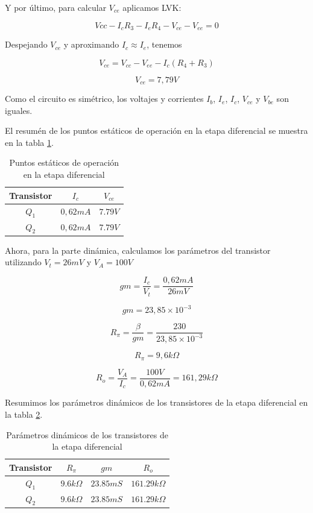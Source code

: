 Y por último, para calcular $V_{ce}$ aplicamos LVK:

$$Vcc - I_cR_3 - I_eR_4 - V_{ce} - V_{ee} = 0$$

Despejando $V_{ce}$ y aproximando $I_c \approx I_e$, tenemos 

$$V_{ce} = V_{cc}  - V_{ee} - I_c (R_4 + R_3)$$

$$V_{ce} = 7,79 V$$

Como el circuito es simétrico, los voltajes y corrientes $I_b$, $I_e$, $I_c$, $V_{ce}$ y $V_{be}$ son iguales.

El resumén de los puntos estáticos de operación en la etapa diferencial se muestra en la tabla \ref{tab:amplificador-diferencial-puntos-estaticos}.

\begin{table}[ht]
    \centering
    \begin{tabular}{|c|c|c|}
        \hline
        Transistor & \textbf{$I_c$} & \textbf{$V_{ce}$} \\
        \hline
        $Q_1$ & $0,62 mA$ & $7.79 V$ \\
        $Q_2$ & $0,62 mA$ & $7.79 V$ \\
        \hline
    \end{tabular}
    \caption{Puntos estáticos de operación en la etapa diferencial}
    \label{tab:amplificador-diferencial-puntos-estaticos}
\end{table}

Ahora, para la parte dinámica, calculamos los parámetros del transistor utilizando $V_t = 26 mV$ y $V_A = 100 V$

$$gm = \frac{I_c}{V_t} = \frac{0,62 mA}{26 mV}$$

$$gm = 23,85 \times 10 ^{-3}$$

$$R_\pi = \frac{\beta}{gm} = \frac{230}{23,85\times 10^{-3}}$$

$$ R_\pi = 9,6k \Omega$$

$$ R_o = \frac{V_A}{I_c} = \frac{100 V}{0,62 mA} = 161,29 k\Omega$$

Resumimos los parámetros dinámicos de los transistores de la etapa diferencial en la tabla \ref{tab:met-etapa-diferencial-parametros-dinamicos}.

\begin{table}[ht]
    \centering
    \begin{tabular}{|c|c|c|c|}
        \hline
        Transistor & $R_\pi$ & $gm$ & $R_o$ \\
        \hline
        $Q_1$ & $9.6 k\Omega$ & $23.85mS$ & $161.29k\Omega$ \\
        \hline
        $Q_2$ & $9.6 k\Omega$ & $23.85mS$ & $161.29k\Omega$ \\
        \hline
    \end{tabular}
    \caption{Parámetros dinámicos de los transistores de la etapa diferencial}
    \label{tab:met-etapa-diferencial-parametros-dinamicos}
    \end{table}

